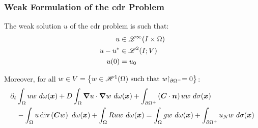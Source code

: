 \begin{frame}
    \frametitle{Weak Formulation of the \acrshort{cdr} Problem}

    \vspace*{\fill}
    \begin{center}
        \begin{minipage}{0.75\textwidth}
            \begin{definition}
                The weak solution $u$ of the \acrshort{cdr} problem is such that:
                \begin{align*}
                    u &\in \SpaceLp{\infty}(I \times \Omega) \\
                    u - u^* &\in \SpaceLp{2}(I; V) \\
                    u(0) &= u_0 %
                \end{align*}

                Moreover, for all $w \in V =  \left\{ w \in \mathscr{H}^{1}(\Omega) \text{ such that } w \!\!\restriction_{\partial \Omega^-} = 0 \right\}$:
                \begin{align*}
                    \partial_t & \int_{\Omega} u w ~ d \omega(\bm{x}) + D \int_{\Omega} \bm{\nabla} u \cdot \bm{\nabla} w ~ d \omega(\bm{x}) + \int_{\partial \Omega^+} \left( \bm{C} \cdot \bm{n} \right) u w ~ d \sigma(\bm{x}) \\ 
                    &- \int_{\Omega} u \operatorname*{div} \left( \bm{C} w \right) ~ d \omega(\bm{x}) + \int_{\Omega} R u w ~ d \omega(\bm{x}) = \int_{\Omega} g w ~ d \omega(\bm{x}) + \int_{\partial \Omega^+} u_N w ~ d \sigma(\bm{x})
                \end{align*}
            \end{definition}
        \end{minipage}
    \end{center}
    \vspace*{\fill}
    
\end{frame}

